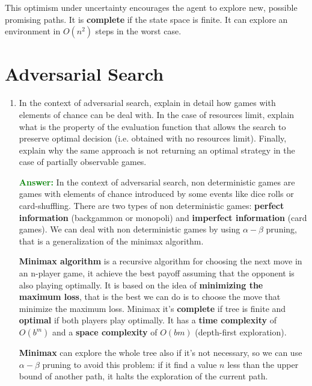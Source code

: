 \documentclass[12pt]{article}
\begin{document}
\begin{enumerate}[label=\textbf{IS.OS.\arabic*}]
\begin{itemize}
        This optimism under uncertainty encourages the agent to explore new, possible promising paths.
        It is \textbf{complete} if the state space is finite.
        It can explore an environment in $O(n^2)$ steps in the worst case.

    \end{itemize}

\end{enumerate}
\section{Adversarial Search}
\begin{enumerate}[label=\textbf{AS.\arabic*}]
    \item In the context of adversarial search, explain in detail how games with elements of chance can be deal with. 
    In the case of resources limit, explain what is the property of the evaluation function that allows the search to 
    preserve optimal decision (i.e. obtained with no resources limit). 
    Finally, explain why the same approach is not returning an optimal strategy in the case of partially observable games.

    \textcolor{green}{\textbf{Answer:}}
    In the context of adversarial search, non deterministic games are games with elements of chance 
    introduced by some events like dice rolls or card-shuffling.
    There are two types of non deterministic games: \textbf{perfect information} (backgammon or monopoli) and \textbf{imperfect information} (card games).
    We can deal with non deterministic games by using $\alpha - \beta$ pruning, that is a generalization of the minimax algorithm.

    \textbf{Minimax algorithm} is a recursive algorithm for choosing the next move in an n-player game, 
    it achieve the best payoff assuming that the opponent is also playing optimally.
    It is based on the idea of \textbf{minimizing the maximum loss}, 
    that is the best we can do is to choose the move that minimize the maximum loss.
    Minimax it's \textbf{complete} if tree is finite and \textbf{optimal} if both players play optimally.
    It has a \textbf{time complexity} of $O(b^m)$ and a \textbf{space complexity} of $O(bm)$ (depth-first exploration).

    \textbf{Minimax} can explore the whole tree also if it's not necessary, 
    so we can use $\alpha - \beta$ pruning to avoid this problem: 
    if it find a value $n$ less than the upper bound of another path, it halts the exploration of the current path.


\end{enumerate}
\end{document}

